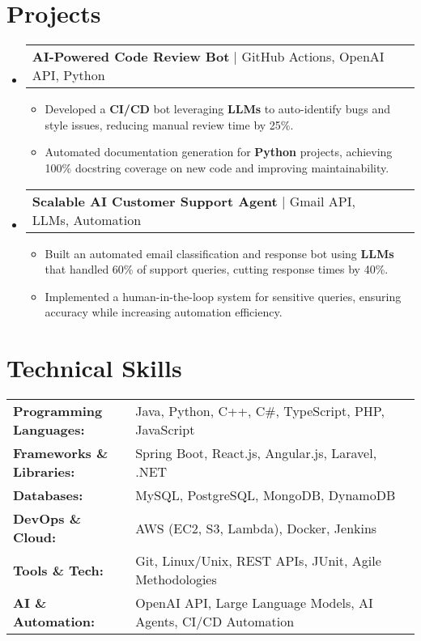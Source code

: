 \documentclass[letterpaper,11pt]{article}
\makeatletter
\newcommand{\resumeItem}[1]{
  \item\footnotesize{
    {#1 \vspace{-2pt}}
  }
}
\newcommand{\resumeProjectHeading}[2]{
    \item
    \begin{tabular*}{1.001\textwidth}{l@{\extracolsep{\fill}}r}
      \small#1 & \textbf{\small #2}\\
    \end{tabular*}\vspace{-7pt}
}
\newcommand{\resumeSubHeadingListStart}{\begin{itemize}[leftmargin=0pt, label={}]}
\newcommand{\resumeSubHeadingListEnd}{\end{itemize}}
\newcommand{\resumeItemListStart}{\begin{itemize}[leftmargin=*]}
\newcommand{\resumeItemListEnd}{\end{itemize}\vspace{-5pt}}
\makeatother
\begin{document}
\section{Projects}
    \vspace{-5pt}
    \resumeSubHeadingListStart
      \resumeProjectHeading
          {\textbf{AI-Powered Code Review Bot} | GitHub Actions, OpenAI API, Python}{}
          \resumeItemListStart
              \resumeItem{Developed a \textbf{CI/CD} bot leveraging \textbf{LLMs} to auto-identify bugs and style issues, reducing manual review time by 25\%.}
              \resumeItem{Automated documentation generation for \textbf{Python} projects, achieving 100\% docstring coverage on new code and improving maintainability.}
          \resumeItemListEnd
          \vspace{-16pt}
      \resumeProjectHeading
          {\textbf{Scalable AI Customer Support Agent} | Gmail API, LLMs, Automation}{}
          \resumeItemListStart
              \resumeItem{Built an automated email classification and response bot using \textbf{LLMs} that handled 60\% of support queries, cutting response times by 40\%.}
              \resumeItem{Implemented a human-in-the-loop system for sensitive queries, ensuring accuracy while increasing automation efficiency.}
          \resumeItemListEnd
    \resumeSubHeadingListEnd
\vspace{-10pt}
\section{Technical Skills}
        \vspace{-14pt}
        \begin{table}[h]
            \footnotesize
            \begin{tabular}{p{0.3\linewidth} p{0.7\linewidth}}
                \textbf{Programming Languages:} & Java, Python, C++, C\#, TypeScript, PHP, JavaScript \\
                \textbf{Frameworks \& Libraries:} & Spring Boot, React.js, Angular.js, Laravel, .NET \\
                \textbf{Databases:} & MySQL, PostgreSQL, MongoDB, DynamoDB \\
                \textbf{DevOps \& Cloud:} & AWS (EC2, S3, Lambda), Docker, Jenkins \\
                \textbf{Tools \& Tech:} & Git, Linux/Unix, REST APIs, JUnit, Agile Methodologies \\
                \textbf{AI \& Automation:} & OpenAI API, Large Language Models, AI Agents, CI/CD Automation \\
            \end{tabular}
        \end{table}
\end{document}
